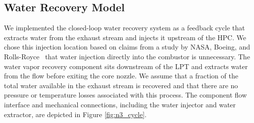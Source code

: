 \documentclass[conf]{new-aiaa}
\begin{document}

\subsection{Water Recovery Model}
We implemented the closed-loop water recovery system as a feedback cycle that extracts water from the exhaust stream and injects it upstream of the HPC.
We chose this injection location based on claims from a study by NASA, Boeing, and Rolls-Royce~\cite{Daggett2010} that water injection directly into the combustor is unnecessary.
The water vapor recovery component sits downstream of the LPT and extracts water from the flow before exiting the core nozzle.
We assume that a fraction of the total water available in the exhaust stream is recovered and that there are no pressure or temperature losses associated with this process.
The component flow interface and mechanical connections, including the water injector and water extractor, are depicted in Figure \ref{fig:n3_cycle}.
\end{document}
